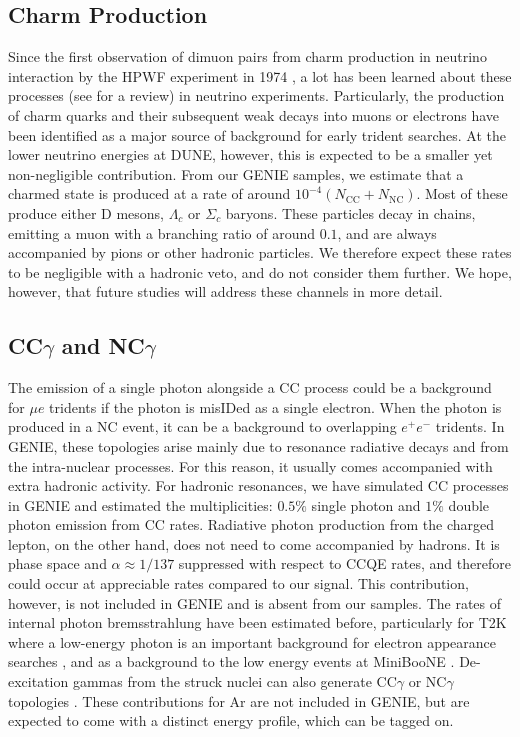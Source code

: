\subsection{Charm Production}

Since the first observation of dimuon pairs from charm production in neutrino interaction by the HPWF experiment in 1974 \cite{Benvenuti:1975ru}, a lot has been learned about these processes (see \cite{Lellis:2004yn} for a review) in neutrino experiments. Particularly, the production of charm quarks and their subsequent weak decays into muons or electrons have been identified as a major source of background for early trident searches. At the lower neutrino energies at DUNE, however, this is expected to be a smaller yet non-negligible contribution. From our GENIE samples, we estimate that a charmed state is produced at a rate of around $10^{-4}(N_\text{CC}+N_\text{NC})$. Most of these produce either D mesons, 
$\Lambda_c$ or $\Sigma_c$ baryons. These particles decay in chains, emitting a muon with a branching ratio of around $0.1$, and are always accompanied by pions or other hadronic particles. We therefore expect these rates to be negligible with a hadronic veto, and do not consider them further. We hope, however, that future studies will address these channels in more detail.

\subsection{CC$\gamma$ and NC$\gamma$}

The emission of a single photon alongside a CC process could be a background for $\mu e$ tridents if the photon is misIDed as a single electron. When the photon is produced in a NC event, it can be a background to overlapping $e^+e^-$ tridents. In GENIE, these topologies arise mainly due to resonance radiative decays and from the intra-nuclear processes. For this reason, it usually comes accompanied with extra hadronic activity. For hadronic resonances, we have simulated CC processes in GENIE and estimated
the multiplicities: $0.5\%$ single
photon and $1\%$ double photon emission from CC rates. Radiative photon production from the charged lepton, on the other hand, does not need to come accompanied by hadrons. It is phase space and $\alpha\approx1/137$ suppressed with respect to CCQE rates, and therefore could occur at appreciable rates compared to our signal. This contribution, however, is not included in GENIE and is absent from our samples. The rates of internal photon bremsstrahlung have been estimated before, particularly for T2K where a low-energy photon is an important background for electron
appearance searches \cite{Efrosinin:2009zz}, and as a background to the low energy events at MiniBooNE \cite{Bodek:2007wb}. De-excitation gammas from the struck nuclei can also generate CC$\gamma$ or NC$\gamma$ topologies \cite{PhysRevLett.108.052505}. These contributions for Ar are not included in GENIE, but are expected to come with a distinct energy profile, which can be tagged on.

